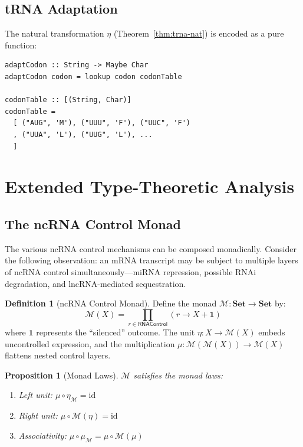 \documentclass[12pt,a4paper]{article}
\newtheorem{proposition}[theorem]{Proposition}
\theoremstyle{definition}
\newtheorem{definition}[theorem]{Definition}
\newcommand{\Set}{\mathbf{Set}}
\newcommand{\RNAType}{\mathsf{RNAControl}}
\begin{document}
\subsection{tRNA Adaptation}

The natural transformation $\eta$ (Theorem~\ref{thm:trna-nat}) is
encoded as a pure function:

\begin{lstlisting}
adaptCodon :: String -> Maybe Char
adaptCodon codon = lookup codon codonTable

codonTable :: [(String, Char)]
codonTable =
  [ ("AUG", 'M'), ("UUU", 'F'), ("UUC", 'F')
  , ("UUA", 'L'), ("UUG", 'L'), ...
  ]
\end{lstlisting}

\section{Extended Type-Theoretic Analysis}\label{sec:extended}

\subsection{The ncRNA Control Monad}

The various ncRNA control mechanisms can be composed monadically.
Consider the following observation: an mRNA transcript may be subject
to multiple layers of ncRNA control simultaneously---miRNA repression,
possible RNAi degradation, and lncRNA-mediated sequestration.

\begin{definition}[ncRNA Control Monad]
Define the monad $\mathcal{M} : \Set \to \Set$ by:
\[
  \mathcal{M}(X) = \prod_{r \in \RNAType} (r \to X + \mathbf{1})
\]
where $\mathbf{1}$ represents the ``silenced'' outcome.  The unit
$\eta : X \to \mathcal{M}(X)$ embeds uncontrolled expression, and the
multiplication $\mu : \mathcal{M}(\mathcal{M}(X)) \to \mathcal{M}(X)$
flattens nested control layers.
\end{definition}

\begin{proposition}[Monad Laws]
$\mathcal{M}$ satisfies the monad laws:
\begin{enumerate}[label=(\roman*)]
  \item Left unit: $\mu \circ \eta_{\mathcal{M}} = \mathrm{id}$
  \item Right unit: $\mu \circ \mathcal{M}(\eta) = \mathrm{id}$
  \item Associativity: $\mu \circ \mu_{\mathcal{M}} =
    \mu \circ \mathcal{M}(\mu)$
\end{enumerate}
\end{proposition}
\end{document}
